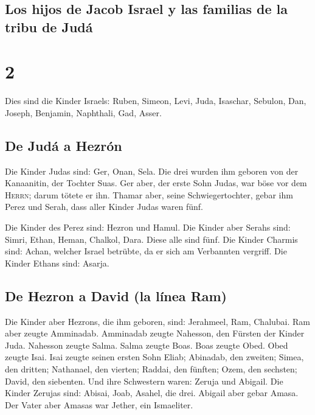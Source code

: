 \hypertarget{los-hijos-de-jacob-israel-y-las-familias-de-la-tribu-de-juduxe1}{%
\subsection{Los hijos de Jacob Israel y las familias de la tribu de
Judá}\label{los-hijos-de-jacob-israel-y-las-familias-de-la-tribu-de-juduxe1}}

\hypertarget{section-1}{%
\section{2}\label{section-1}}

 Dies sind die Kinder Israels: Ruben, Simeon, Levi, Juda,
Isaschar, Sebulon,  Dan, Joseph, Benjamin, Naphthali, Gad,
Asser.

\hypertarget{de-juduxe1-a-hezruxf3n}{%
\subsection{De Judá a Hezrón}\label{de-juduxe1-a-hezruxf3n}}

 Die Kinder Judas sind: Ger, Onan, Sela. Die drei wurden
ihm geboren von der Kanaanitin, der Tochter Suas. Ger aber, der erste
Sohn Judas, war böse vor dem \textsc{Herrn}; darum tötete er ihn.
 Thamar aber, seine Schwiegertochter, gebar ihm Perez und
Serah, dass aller Kinder Judas waren fünf.

 Die Kinder des Perez sind: Hezron und Hamul.
 Die Kinder aber Serahs sind: Simri, Ethan, Heman,
Chalkol, Dara. Diese alle sind fünf.  Die Kinder Charmis
sind: Achan, welcher Israel betrübte, da er sich am Verbannten vergriff.
 Die Kinder Ethans sind: Asarja.

\hypertarget{de-hezron-a-david-la-luxednea-ram}{%
\subsection{De Hezron a David (la línea
Ram)}\label{de-hezron-a-david-la-luxednea-ram}}

 Die Kinder aber Hezrons, die ihm geboren, sind:
Jerahmeel, Ram, Chalubai.  Ram aber zeugte Amminadab.
Amminadab zeugte Nahesson, den Fürsten der Kinder Juda. 
Nahesson zeugte Salma. Salma zeugte Boas.  Boas zeugte
Obed. Obed zeugte Isai.  Isai zeugte seinen ersten Sohn
Eliab; Abinadab, den zweiten; Simea, den dritten; 
Nathanael, den vierten; Raddai, den fünften;  Ozem, den
sechsten; David, den siebenten.  Und ihre Schwestern
waren: Zeruja und Abigail. Die Kinder Zerujas sind: Abisai, Joab,
Asahel, die drei.  Abigail aber gebar Amasa. Der Vater
aber Amasas war Jether, ein Ismaeliter.


